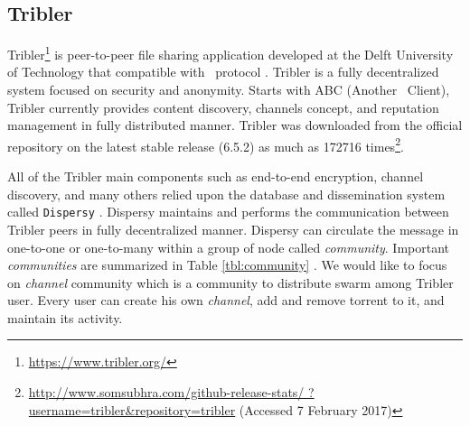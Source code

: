 \subsection{Tribler}
\label{section:tribler}
Tribler\footnote{\url{https://www.tribler.org/}} is peer-to-peer file sharing application developed at the Delft University of Technology that compatible with \bt~protocol \cite{2008:tribler:pouwelse}. Tribler is a fully decentralized system focused on security and anonymity. Starts with ABC (Another \bt~Client), Tribler currently provides content discovery, channels concept, and reputation management in fully distributed manner. Tribler was downloaded from the official repository on the latest stable release (6.5.2) as much as 172716 times\footnote{\url{http://www.somsubhra.com/github-release-stats/ ?username=tribler&repository=tribler} (Accessed 7 February 2017)}.

All of the Tribler main components such as end-to-end encryption, channel discovery, and many others relied upon the database and dissemination system called \texttt{Dispersy} \cite{2013:dispersy:zeilemaker}. Dispersy maintains and performs the communication between Tribler peers in fully decentralized manner. Dispersy can circulate the message in one-to-one or one-to-many within a group of node called \textit{community}. Important \textit{communities} are summarized in Table \ref{tbl:community} \cite{2016:tribler-techdebt:vos}. We would like to focus on \textit{channel} community which is a community to distribute swarm among Tribler user. Every user can create his own \textit{channel}, add and remove torrent to it, and maintain its activity. 


